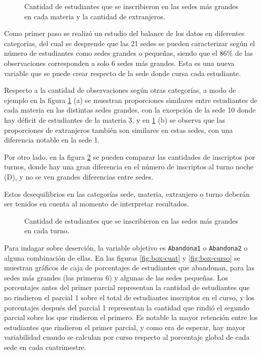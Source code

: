 \documentclass[a4paper,11pt,dvipsnames]{article}
\begin{document}
\begin{figure}[!hb]
    \begin{center}
        
    \end{center}
    \caption{Cantidad de estudiantes que se inscribieron en las sedes más grandes en cada materia y la cantidad de extranjeros.}
    \label{fig:nalum}
\end{figure}


Como primer paso se realizó un estudio del balance de los datos en diferentes categorías, del cual se desprende que las 21 sedes se pueden caracterizar según el número de estudiantes como sedes grandes o pequeñas, siendo que el 86\% de las observaciones corresponden a solo 6 sedes más grandes. Esta es una nueva variable que se puede crear respecto de la sede donde cursa cada estudiante.\par\medskip

Respecto a la cantidad de observaciones según otras categorías, a modo de ejemplo en la figura \ref{fig:nalum} (a) se muestran proporciones similares entre estudiantes de cada materia en las distintas sedes grandes, con la excepción de la sede 10 donde hay déficit de estudiantes de la materia 3, y en \ref{fig:nalum} (b) se observa que las proporciones de extranjeros también son similares en estas sedes, con una diferencia notable en la sede 1.\par\medskip

Por otro lado, en la figura \ref{fig:turnos} se pueden comparar las cantidades de inscriptos por turnos, donde hay una gran diferencia en el número de inscriptos al turno noche (D), y no se ven grandes diferencias entre sedes.\par\medskip

Estos desequilibrios en las categorías sede, materia, extranjero o turno deberán ser tenidos en cuenta al momento de interpretar resultados.


\begin{figure}[!h]
    \begin{center}
        
    \end{center}
    \caption{Cantidad de estudiantes que se inscribieron en las sedes más grandes en cada turno.}
    \label{fig:turnos}
\end{figure}

Para indagar sobre deserción, la variable objetivo es \texttt{Abandona1} o \texttt{Abandona2} o alguna combinación de ellas. En las figuras \ref{fig:box-cuat} y \ref{fig:box-curso} se muestran gráficos de caja de porcentajes de estudiantes que abandonan, para las sedes más grandes (las primeras 6) y algunas de las sedes pequeñas. Los porcentajes antes del primer parcial representan la cantidad de estudiantes que no rindieron el parcial 1 sobre el total de estudiantes inscriptos en el curso, y los porcentajes después del parcial 1 representan la cantidad que rindió el segundo parcial sobre los que rindieron el primero. Es notable la mayor retención entre los estudiantes que rindieron el primer parcial, y como era de esperar, hay mayor variabilidad cuando se calculan por curso respecto al porcentaje global de cada sede en cada cuatrimestre.
\end{document}
